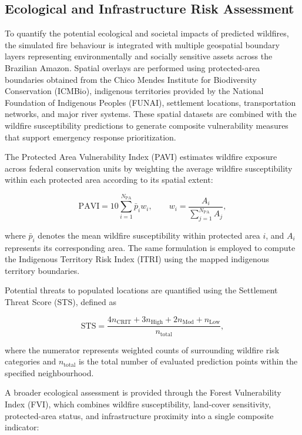 \documentclass{ieeeaccess}
\begin{document}
\subsection{Ecological and Infrastructure Risk Assessment}

To quantify the potential ecological and societal impacts of predicted wildfires, the simulated fire behaviour is integrated with multiple geospatial boundary layers representing environmentally and socially sensitive assets across the Brazilian Amazon. Spatial overlays are performed using protected-area boundaries obtained from the Chico Mendes Institute for Biodiversity Conservation (ICMBio), indigenous territories provided by the National Foundation of Indigenous Peoples (FUNAI), settlement locations, transportation networks, and major river systems. These spatial datasets are combined with the wildfire susceptibility predictions to generate composite vulnerability measures that support emergency response prioritization.

The Protected Area Vulnerability Index (PAVI) estimates wildfire exposure across federal conservation units by weighting the average wildfire susceptibility within each protected area according to its spatial extent:

\begin{equation}
\text{PAVI}
=
10
\sum_{i=1}^{N_{\text{PA}}}
\bar{p}_i
w_i,
\qquad
w_i
=
\frac{A_i}
{\displaystyle\sum_{j=1}^{N_{\text{PA}}}A_j},
\label{eq:pavi}
\end{equation}

where $\bar{p}_i$ denotes the mean wildfire susceptibility within protected area $i$, and $A_i$ represents its corresponding area. The same formulation is employed to compute the Indigenous Territory Risk Index (ITRI) using the mapped indigenous territory boundaries.

Potential threats to populated locations are quantified using the Settlement Threat Score (STS), defined as

\begin{equation}
\text{STS}
=
\frac{
4n_{\text{CRIT}}
+
3n_{\text{High}}
+
2n_{\text{Mod}}
+
n_{\text{Low}}
}
{n_{\text{total}}},
\label{eq:sts}
\end{equation}

where the numerator represents weighted counts of surrounding wildfire risk categories and $n_{\text{total}}$ is the total number of evaluated prediction points within the specified neighbourhood.

A broader ecological assessment is provided through the Forest Vulnerability Index (FVI), which combines wildfire susceptibility, land-cover sensitivity, protected-area status, and infrastructure proximity into a single composite indicator:
\end{document}
